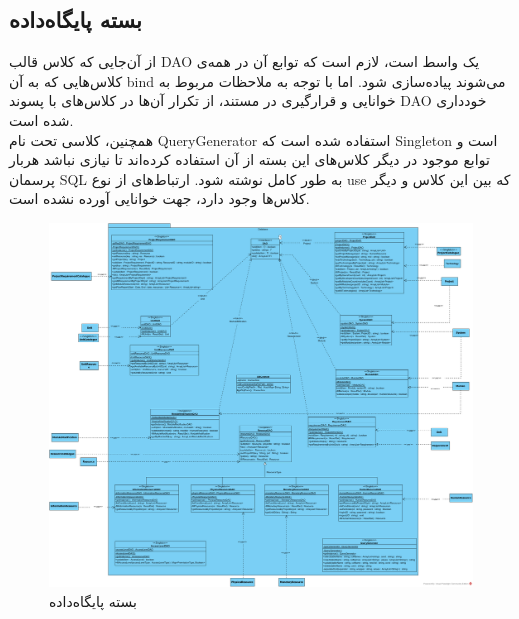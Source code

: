\begin{landscape}
\newpage
\section{بسته پایگاه‌داده}
از آن‌جایی که کلاس قالب
 DAO یک واسط است، لازم است که توابع آن در همه‌ی کلاس‌هایی که به آن bind می‌شوند پیاده‌سازی شود. اما با توجه به ملاحظات مربوط به خوانایی و قرارگیری در مستند، از تکرار آن‌ها در کلاس‌های با پسوند DAO خودداری شده است.
 \\
 همچنین، کلاسی تحت نام QueryGenerator استفاده شده است که Singleton است و توابع موجود در دیگر کلاس‌های این بسته از آن استفاده کرده‌اند تا نیازی نباشد هربار پرسمان SQL به طور کامل نوشته شود. ارتباط‌های از نوع use که بین این کلاس و دیگر کلاس‌ها وجود دارد، جهت خوانایی آورده نشده است.
\begin{figure}[H]
	\centering
	\includegraphics[scale=0.4]{img/class-design/DatabasePackage}
	\caption{بسته پایگاه‌داده}
\end{figure}
\end{landscape}


